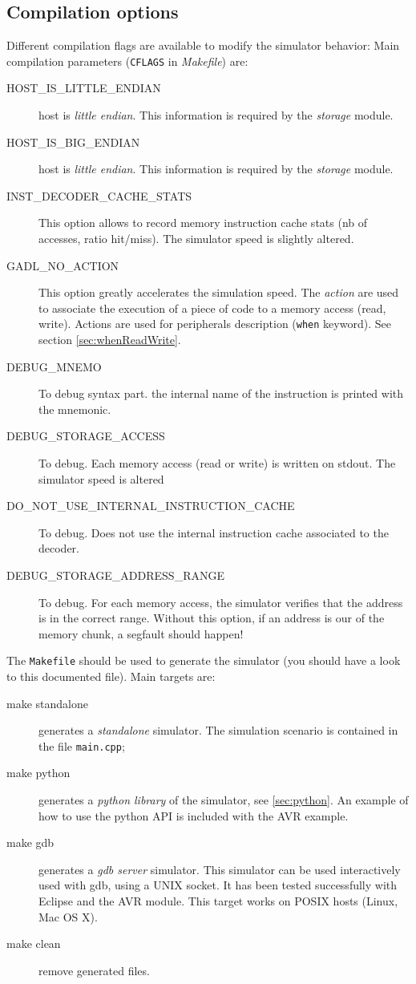 \subsection{Compilation options}
\label{sec:cflags}
Different compilation flags are available to modify the simulator behavior:
Main compilation parameters (\texttt{CFLAGS} in \emph{Makefile}) are:
\begin{description}
\item[HOST\_IS\_LITTLE\_ENDIAN] host is \emph{little endian}. This information is required by the \emph{storage} module.
\item[HOST\_IS\_BIG\_ENDIAN] host is \emph{little endian}. This information is required by the \emph{storage} module.
\item[INST\_DECODER\_CACHE\_STATS] This option allows to record memory instruction cache stats (nb of accesses, ratio hit/miss). The simulator speed is slightly altered.
\item[GADL\_NO\_ACTION] This option greatly accelerates the simulation speed. The \emph{action} are used to associate the execution of a piece of code to a memory access (read, write). Actions are used for peripherals description (\texttt{when} keyword). See section \ref{sec:whenReadWrite}.
\item[DEBUG\_MNEMO] To debug syntax part. the internal name of the instruction is printed with the mnemonic.
\item[DEBUG\_STORAGE\_ACCESS] To debug. Each memory access (read or write) is written on stdout. The simulator speed is altered
\item[DO\_NOT\_USE\_INTERNAL\_INSTRUCTION\_CACHE] To debug. Does not use the internal instruction cache associated to the decoder.
\item[DEBUG\_STORAGE\_ADDRESS\_RANGE] To debug. For each memory access, the simulator verifies that the address is in the correct range. Without this option, if an address is our of the memory chunk, a segfault should happen!
\end{description}

The \texttt{Makefile} should be used to generate the simulator (you should have a look to this documented file). Main targets are:
\begin{description}
\item[make standalone] generates a \emph{standalone} simulator. The simulation scenario is contained in the file \texttt{main.cpp};
\item[make python] generates a \emph{python library} of the simulator, see \ref{sec:python}. An example of how to use the python API is included with the AVR example.
\item[make gdb] generates a \emph{gdb server} simulator. This simulator can be used interactively used with gdb, using a UNIX socket. It has been tested successfully with Eclipse and the AVR module. This target works on POSIX hosts (Linux, Mac OS X).
\item[make clean] remove generated files.
\end{description}



